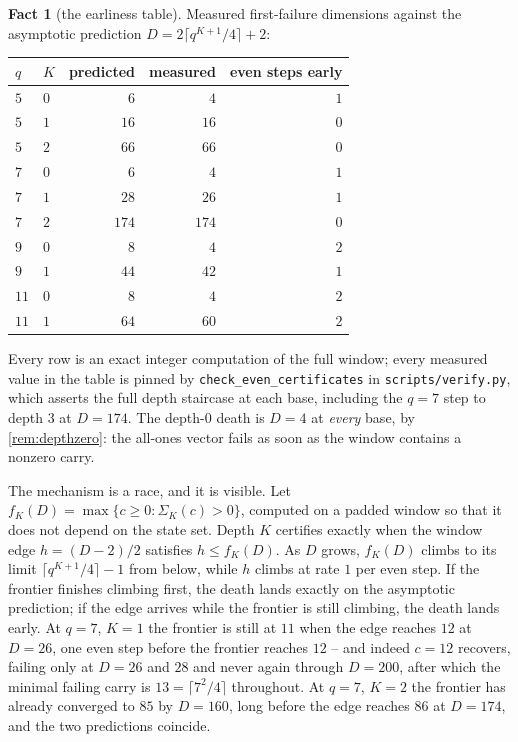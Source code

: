 \documentclass[11pt]{amsart}
\theoremstyle{definition}
\newtheorem{fact}[theorem]{Fact}
\theoremstyle{remark}
\begin{document}
\begin{fact}[the earliness table]
\label{fact:early}
Measured first-failure dimensions against the asymptotic prediction $D = 2\lceil q^{K+1}/4\rceil + 2$:
\begin{center}
\begin{tabular}{llrrr}
\toprule
$q$ & $K$ & predicted & measured & even steps early \\
\midrule
$5$  & $0$   & $6$   & $4$   & $1$ \\
$5$  & $1$   & $16$  & $16$  & $0$ \\
$5$  & $2$   & $66$  & $66$  & $0$ \\
$7$  & $0$   & $6$   & $4$   & $1$ \\
$7$  & $1$   & $28$  & $26$  & $1$ \\
$7$  & $2$   & $174$ & $174$ & $0$ \\
$9$  & $0$   & $8$   & $4$   & $2$ \\
$9$  & $1$   & $44$  & $42$  & $1$ \\
$11$ & $0$   & $8$   & $4$   & $2$ \\
$11$ & $1$   & $64$  & $60$  & $2$ \\
\bottomrule
\end{tabular}
\end{center}
Every row is an exact integer computation of the full window; every measured value in the table is pinned by \texttt{check\_even\_certificates} in \texttt{scripts/verify.py}, which asserts the full depth staircase at each base, including the $q = 7$ step to depth $3$ at $D = 174$. The depth-$0$ death is $D = 4$ at \emph{every} base, by \cref{rem:depthzero}: the all-ones vector fails as soon as the window contains a nonzero carry.
\end{fact}

The mechanism is a race, and it is visible. Let $f_K(D) = \max\{c \ge 0 : \Sigma_K(c) > 0\}$, computed on a padded window so that it does not depend on the state set. Depth $K$ certifies exactly when the window edge $h = (D-2)/2$ satisfies $h \le f_K(D)$. As $D$ grows, $f_K(D)$ climbs to its limit $\lceil q^{K+1}/4\rceil - 1$ from below, while $h$ climbs at rate $1$ per even step. If the frontier finishes climbing first, the death lands exactly on the asymptotic prediction; if the edge arrives while the frontier is still climbing, the death lands early. At $q = 7$, $K = 1$ the frontier is still at $11$ when the edge reaches $12$ at $D = 26$, one even step before the frontier reaches $12$ -- and indeed $c = 12$ recovers, failing only at $D = 26$ and $28$ and never again through $D = 200$, after which the minimal failing carry is $13 = \lceil 7^2/4\rceil$ throughout. At $q = 7$, $K = 2$ the frontier has already converged to $85$ by $D = 160$, long before the edge reaches $86$ at $D = 174$, and the two predictions coincide.
\end{document}
